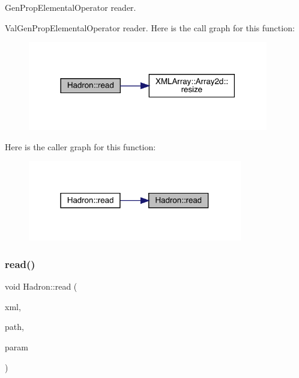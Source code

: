 Gen\+Prop\+Elemental\+Operator reader. 

Val\+Gen\+Prop\+Elemental\+Operator reader. Here is the call graph for this function\+:\nopagebreak
\begin{figure}[H]
\begin{center}
\leavevmode
\includegraphics[width=297pt]{d1/daf/namespaceHadron_a26908582ef57fc950c0944a69dfcc275_cgraph}
\end{center}
\end{figure}
Here is the caller graph for this function\+:\nopagebreak
\begin{figure}[H]
\begin{center}
\leavevmode
\includegraphics[width=265pt]{d1/daf/namespaceHadron_a26908582ef57fc950c0944a69dfcc275_icgraph}
\end{center}
\end{figure}
\mbox{\label{namespaceHadron_acbb0293cc9773c6009050757b471c4d8}} 
\subsubsection{\texorpdfstring{read()}{read()}\hspace{0.1cm}{\footnotesize\ttfamily [75/94]}}
{\footnotesize\ttfamily void Hadron\+::read (\begin{DoxyParamCaption}\item[{\mbox{\hyperlink{classADATXML_1_1XMLReader}{X\+M\+L\+Reader}} \&}]{xml,  }\item[{const std\+::string \&}]{path,  }\item[{\mbox{\hyperlink{structHadron_1_1KeyHadronNode__t}{Key\+Hadron\+Node\+\_\+t}} \&}]{param }\end{DoxyParamCaption})}



